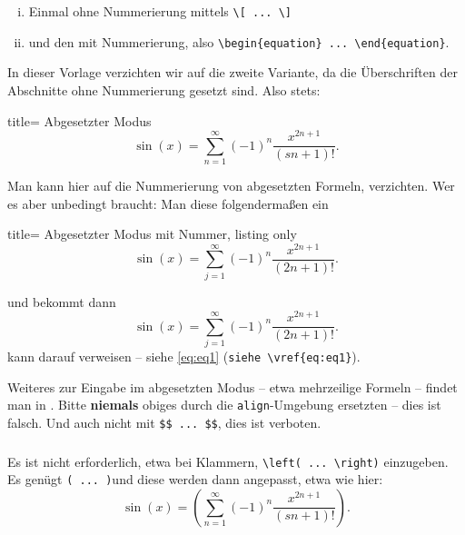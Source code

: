 \begin{refsection}
\begin{enumerate}[(i)]
\item
Einmal ohne Nummerierung mittels \verb|\[ ... \]| 

\item
und den mit Nummerierung, also  
\verb|\begin{equation} ... \end{equation}|.
\end{enumerate} 
%
In dieser Vorlage verzichten wir auf die zweite Variante, da die Überschriften der Abschnitte ohne Nummerierung gesetzt sind.
Also stets:
\begin{tcblisting}{title= Abgesetzter Modus}
\[
	\sin(x) = \sum_{n=1}^{\infty} (-1)^{n} 
		\frac{ x^{2n+1} }{ (sn+1)! } .
\]
%
\end{tcblisting}
Man kann hier auf die Nummerierung von abgesetzten Formeln, verzichten. 
Wer es aber unbedingt braucht: Man diese folgendermaßen ein 
\begin{tcblisting}{title= Abgesetzter Modus mit Nummer, listing only}
\begin{equation}\label{eq:eq1}
	\sin(x) = \sum_{j=1}^{\infty} (-1)^{n} \frac{ x^{2n+1} }{ (2n+1)! } .
\end{equation}
\end{tcblisting}
und bekommt dann 
%
\begin{equation}\label{eq:eq1}
	\sin(x) = \sum_{j=1}^{\infty} (-1)^{n} \frac{ x^{2n+1} }{ (2n+1)! } .
\end{equation}
kann darauf verweisen -- siehe \vref{eq:eq1} (\verb|siehe \vref{eq:eq1}|).

Weiteres zur Eingabe im abgesetzten Modus -- etwa mehrzeilige Formeln -- findet man in \textcite{short-math-guide}.
Bitte \textbf{niemals} obiges durch die \verb|align|-Umgebung ersetzten -- dies ist falsch. Und auch nicht mit \verb|$$ ... $$|, dies ist verboten.%
\subsubsection{}
Es ist nicht erforderlich, etwa bei Klammern, \verb|\left( ... \right)| einzugeben. 
Es genügt \verb|( ... )|und diese werden dann angepasst, etwa wie hier:
%
%
\[
	\sin(x) = ( \sum_{n=1}^{\infty} (-1)^{n} 
		\frac{ x^{2n+1} }{ (sn+1)! } ) .
\]
%

\end{refsection}

